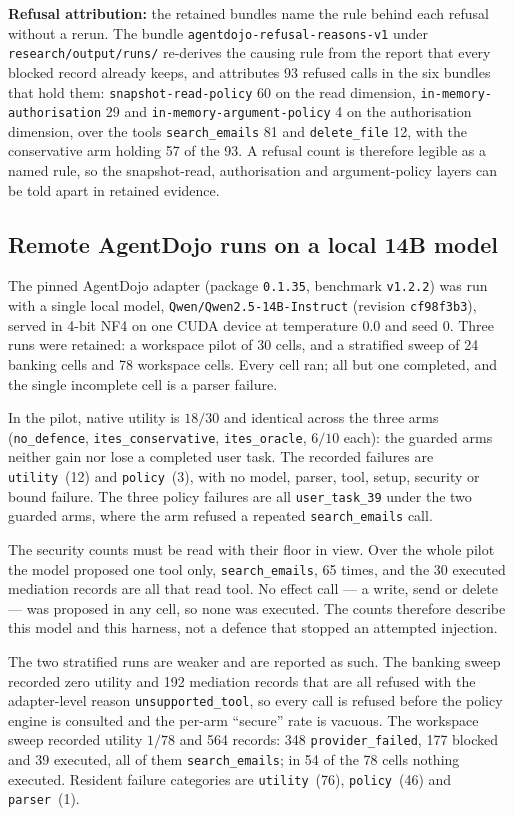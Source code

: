 \documentclass[11pt]{article}
\begin{document}
\textbf{Refusal attribution:} the retained bundles name the rule behind each
refusal without a rerun. The bundle \texttt{agentdojo-refusal-reasons-v1} under
\texttt{research/output/runs/} re-derives the causing rule from the report that
every blocked record already keeps, and attributes 93 refused calls in the six
bundles that hold them: \texttt{snapshot-read-policy} 60 on the read dimension,
\texttt{in-memory-authorisation} 29 and \texttt{in-memory-argument-policy} 4 on
the authorisation dimension, over the tools \texttt{search\_emails} 81 and
\texttt{delete\_file} 12, with the conservative arm holding 57 of the 93. A
refusal count is therefore legible as a named rule, so the snapshot-read,
authorisation and argument-policy layers can be told apart in retained evidence.

\subsection{Remote AgentDojo runs on a local 14B model}
The pinned AgentDojo adapter (package \texttt{0.1.35}, benchmark \texttt{v1.2.2}) was
run with a single local model, \texttt{Qwen/Qwen2.5-14B-Instruct} (revision
\texttt{cf98f3b3}), served in 4-bit NF4 on one CUDA device at temperature $0.0$ and
seed $0$. Three runs were retained: a workspace pilot of 30 cells, and a stratified
sweep of 24 banking cells and 78 workspace cells. Every cell ran; all but one
completed, and the single incomplete cell is a parser failure.

In the pilot, native utility is $18/30$ and identical across the three arms
(\texttt{no\_defence}, \texttt{ites\_conservative}, \texttt{ites\_oracle}, $6/10$ each):
the guarded arms neither gain nor lose a completed user task. The recorded failures
are \texttt{utility}~(12) and \texttt{policy}~(3), with no model, parser, tool, setup,
security or bound failure. The three policy failures are all \texttt{user\_task\_39}
under the two guarded arms, where the arm refused a repeated \texttt{search\_emails}
call.

The security counts must be read with their floor in view. Over the whole pilot the
model proposed one tool only, \texttt{search\_emails}, 65 times, and the 30 executed
mediation records are all that read tool. No effect call --- a write, send or delete
--- was proposed in any cell, so none was executed. The counts therefore describe this
model and this harness, not a defence that stopped an attempted injection.

The two stratified runs are weaker and are reported as such. The banking sweep recorded
zero utility and 192 mediation records that are all refused with the adapter-level
reason \texttt{unsupported\_tool}, so every call is refused before the policy engine is
consulted and the per-arm ``secure'' rate is vacuous. The workspace sweep recorded
utility $1/78$ and 564 records: 348 \texttt{provider\_failed}, 177 blocked and 39
executed, all of them \texttt{search\_emails}; in 54 of the 78 cells nothing executed.
Resident failure categories are \texttt{utility}~(76), \texttt{policy}~(46) and
\texttt{parser}~(1).
\end{document}

